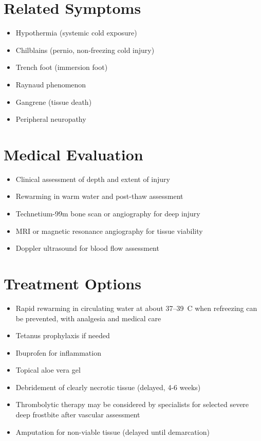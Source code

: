\section*{Related Symptoms}
\begin{itemize}
\item Hypothermia (systemic cold exposure)
\item Chilblains (pernio, non-freezing cold injury)
\item Trench foot (immersion foot)
\item Raynaud phenomenon
\item Gangrene (tissue death)
\item Peripheral neuropathy
\end{itemize}

\section*{Medical Evaluation}
\begin{itemize}
\item Clinical assessment of depth and extent of injury
\item Rewarming in warm water and post-thaw assessment
\item Technetium-99m bone scan or angiography for deep injury
\item MRI or magnetic resonance angiography for tissue viability
\item Doppler ultrasound for blood flow assessment
\end{itemize}

\section*{Treatment Options}
\begin{itemize}
\item Rapid rewarming in circulating water at about 37--39~\textdegree{}C when refreezing can be prevented, with analgesia and medical care
\item Tetanus prophylaxis if needed
\item Ibuprofen for inflammation
\item Topical aloe vera gel
\item Debridement of clearly necrotic tissue (delayed, 4-6 weeks)
\item Thrombolytic therapy may be considered by specialists for selected severe deep frostbite after vascular assessment
\item Amputation for non-viable tissue (delayed until demarcation)
\end{itemize}
